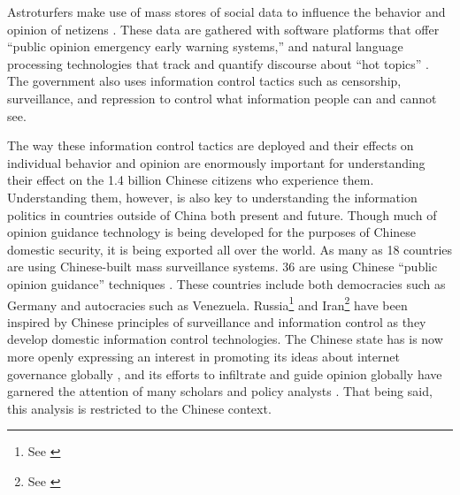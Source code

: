 \documentclass[11pt]{article}
\begin{document}
Astroturfers make use of mass stores of social data to influence the behavior and opinion of netizens \citep{zeng2015wangluo, zhou2011weibo}. These data are gathered with software platforms that offer ``public opinion emergency early warning systems,'' and natural language processing technologies that track and quantify discourse about ``hot topics'' \citep[201-228]{zhou2011weibo}. The government also uses information control tactics such as censorship, surveillance, and repression to control what information people can and cannot see.

The way these information control tactics are deployed and their effects on individual behavior and opinion are enormously important for understanding their effect on the 1.4 billion Chinese citizens who experience them. Understanding them, however, is also key to understanding the information politics in countries outside of China both present and future. Though much of opinion guidance technology is being developed for the purposes of Chinese domestic security, it is being exported all over the world. As many as 18 countries are using Chinese-built mass surveillance systems. 36 are using Chinese ``public opinion guidance'' techniques \citep{mozur2019made}. These countries include both democracies such as Germany and autocracies such as Venezuela. Russia\footnote{See \cite{morgus2019analysis}} and Iran\footnote{See \cite{farda2019iran}} have been inspired by Chinese principles of surveillance and information control as they develop domestic information control technologies. The Chinese state has is now more openly expressing an interest in promoting its ideas about internet governance globally \citep{deibert2008geopolitics}, and its efforts to infiltrate and guide opinion globally have garnered the attention of many scholars and policy analysts \citep{diamond2019china,brady2018new}. That being said, this analysis is restricted to the Chinese context. 
\end{document}
